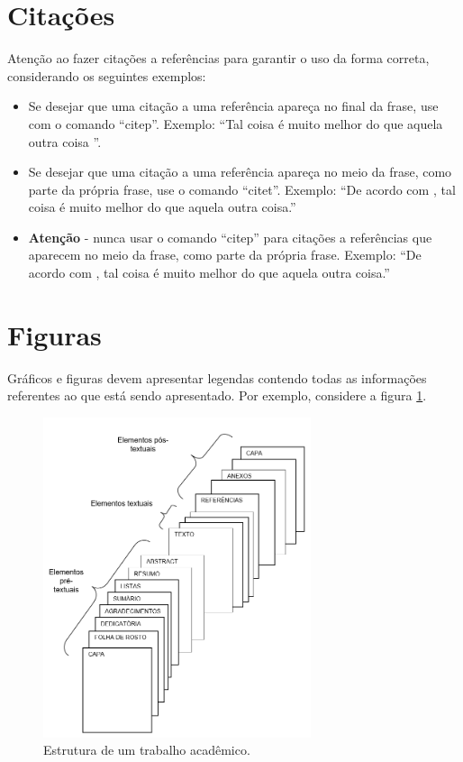 \section{Citações}

Atenção ao fazer citações a referências para garantir o uso da forma correta, considerando os seguintes exemplos:
\begin{itemize}
	\item Se desejar que uma citação a uma referência apareça no final da frase, use com o comando ``citep''. Exemplo: ``Tal coisa é muito melhor do que aquela outra coisa \citep{Beltrano2021}''.
	\item Se desejar que uma citação a uma referência apareça no meio da frase, como parte da própria frase, use o comando ``citet''. Exemplo: ``De acordo com \citet{Fulano2021}, tal coisa é muito melhor do que aquela outra coisa.''
	\item \textbf{Atenção} - nunca usar o comando ``citep'' para citações a referências que aparecem no meio da frase, como parte da própria frase. Exemplo: ``De acordo com \citep{Ciclano2021}, tal coisa é muito melhor do que aquela outra coisa.''
\end{itemize}

\clearpage

\section{Figuras}

Gráficos e figuras devem apresentar legendas contendo todas as informações referentes ao que está sendo apresentado. Por exemplo, considere a figura \ref{fig:C3_1}. 

\begin{figure}[!h] 
	\centering
	\includegraphics[width=0.7\textwidth]{./cap3/figs/elementos.jpg}
	\caption{Estrutura de um trabalho acadêmico.}
	\label{fig:C3_1}
\end{figure}

